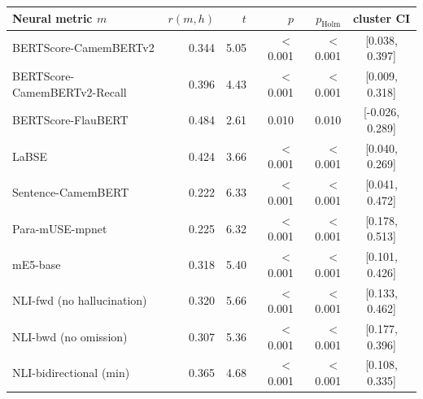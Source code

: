 \setlength{\tabcolsep}{4pt}
\begin{tabular}{lrrrrc}
\toprule
Neural metric $m$ & $r(m,h)$ & $t$ & $p$ & $p_{\text{Holm}}$ & cluster CI \\
\midrule
BERTScore-CamemBERTv2 & 0.344 & 5.05 & $<$0.001 & $<$0.001 & [0.038, 0.397] \\
BERTScore-CamemBERTv2-Recall & 0.396 & 4.43 & $<$0.001 & $<$0.001 & [0.009, 0.318] \\
BERTScore-FlauBERT & 0.484 & 2.61 & 0.010 & 0.010 & [-0.026, 0.289] \\
LaBSE & 0.424 & 3.66 & $<$0.001 & $<$0.001 & [0.040, 0.269] \\
Sentence-CamemBERT & 0.222 & 6.33 & $<$0.001 & $<$0.001 & [0.041, 0.472] \\
Para-mUSE-mpnet & 0.225 & 6.32 & $<$0.001 & $<$0.001 & [0.178, 0.513] \\
mE5-base & 0.318 & 5.40 & $<$0.001 & $<$0.001 & [0.101, 0.426] \\
NLI-fwd (no hallucination) & 0.320 & 5.66 & $<$0.001 & $<$0.001 & [0.133, 0.462] \\
NLI-bwd (no omission) & 0.307 & 5.36 & $<$0.001 & $<$0.001 & [0.177, 0.396] \\
NLI-bidirectional (min) & 0.365 & 4.68 & $<$0.001 & $<$0.001 & [0.108, 0.335] \\
\bottomrule
\end{tabular}
